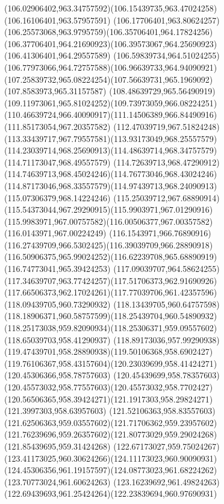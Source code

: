 {    \curveto(106.02906402,963.34757592)(106.15439735,963.47024258)(106.16106401,963.57957591)
    \curveto(106.17706401,963.80624257)(106.25573068,963.9795759)(106.35706401,964.17824256)
    \curveto(106.37706401,964.21690923)(106.39573067,964.25690923)(106.41306401,964.29557589)
    \curveto(106.59839734,964.51024255)(106.77973066,964.72757588)(106.96639733,964.94090921)
    \curveto(107.25839732,965.08224254)(107.56639731,965.1969092)(107.8583973,965.31157587)
    \curveto(108.48639729,965.56490919)(109.11973061,965.81024252)(109.73973059,966.08224251)
    \curveto(110.46639724,966.40090917)(111.14506389,966.84490916)(111.85173054,967.20357582)
    \curveto(112.47039719,967.51824248)(113.33439717,967.79557581)(113.93173049,968.25557579)
    \curveto(114.23039714,968.25690913)(114.48639714,968.34757579)(114.71173047,968.49557579)
    \curveto(114.72639713,968.47290912)(114.74639713,968.45024246)(114.76773046,968.43024246)
    \curveto(114.87173046,968.33557579)(114.97439713,968.24090913)(115.07306379,968.14224246)
    \curveto(115.25039712,967.68890914)(115.54373044,967.29290915)(115.9903971,967.01290916)
    \curveto(115.9983971,967.00757582)(116.00506377,967.00357582)(116.0143971,967.00224249)
    \curveto(116.1543971,966.76890916)(116.27439709,966.5302425)(116.39039709,966.28890918)
    \curveto(116.50906375,965.99024252)(116.62239708,965.68890919)(116.74773041,965.39424253)
    \curveto(117.09039707,964.58624255)(117.34639707,963.77424257)(117.51706373,962.91690926)
    \curveto(117.66506373,962.17024261)(117.77039706,961.42357596)(118.09439705,960.73290932)
    \curveto(118.13439705,960.64757598)(118.18906371,960.58757599)(118.25439704,960.54890932)
    \curveto(118.25173038,959.82090934)(118.25306371,959.09557602)(118.65039703,958.41290937)
    \curveto(118.89173036,957.99290938)(119.47439701,958.28890938)(119.50106368,958.6902427)
    \curveto(119.76106367,958.43157604)(120.23039699,958.41424271)(120.45306366,958.78757603)
    \curveto(120.45439699,958.78357603)(120.45573032,958.77557603)(120.45573032,958.7702427)
    \curveto(120.56506365,958.39424271)(121.1917303,958.29824271)(121.3997303,958.63957603)
    \curveto(121.52106363,958.83557603)(121.62506363,959.03557602)(121.71706362,959.23957602)
    \curveto(121.76239696,959.26357602)(121.80773029,959.29024268)(121.85439695,959.31424268)
    \curveto(122.67173027,959.75024267)(123.41173025,960.30624266)(124.11173023,960.90090931)
    \curveto(124.45306356,961.19157597)(124.08773023,961.68224262)(123.70773024,961.60624263)
    \curveto(123.16239692,961.49824263)(122.69439693,961.25424264)(122.23839694,960.97690931)
}
